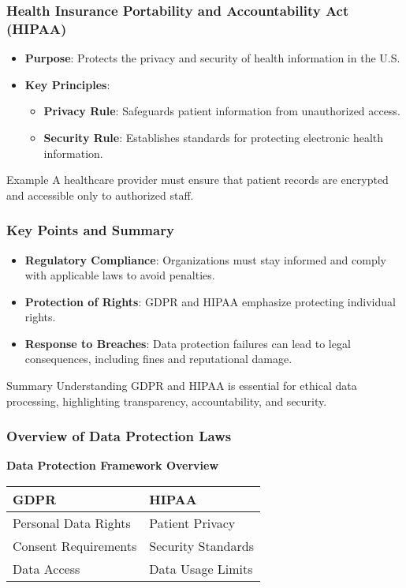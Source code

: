 \documentclass{beamer}
\begin{document}
\begin{frame}[fragile]
    \frametitle{Health Insurance Portability and Accountability Act (HIPAA)}
    \begin{itemize}
        \item \textbf{Purpose}: Protects the privacy and security of health information in the U.S.
        \item \textbf{Key Principles}:
        \begin{itemize}
            \item \textbf{Privacy Rule}: Safeguards patient information from unauthorized access.
            \item \textbf{Security Rule}: Establishes standards for protecting electronic health information.
        \end{itemize}
    \end{itemize}
    \begin{block}{Example}
        A healthcare provider must ensure that patient records are encrypted and accessible only to authorized staff.
    \end{block}
\end{frame}

\begin{frame}[fragile]
    \frametitle{Key Points and Summary}
    \begin{itemize}
        \item \textbf{Regulatory Compliance}: Organizations must stay informed and comply with applicable laws to avoid penalties.
        \item \textbf{Protection of Rights}: GDPR and HIPAA emphasize protecting individual rights.
        \item \textbf{Response to Breaches}: Data protection failures can lead to legal consequences, including fines and reputational damage.
    \end{itemize}
    \begin{block}{Summary}
        Understanding GDPR and HIPAA is essential for ethical data processing, highlighting transparency, accountability, and security.
    \end{block}
\end{frame}

\begin{frame}[fragile]
    \frametitle{Overview of Data Protection Laws}
    \centering
    \textbf{Data Protection Framework Overview}
    \begin{table}[h]
        \begin{tabular}{|l|l|}
            \hline
            \textbf{GDPR} & \textbf{HIPAA} \\ \hline
            Personal Data Rights & Patient Privacy \\ \hline
            Consent Requirements & Security Standards \\ \hline
            Data Access & Data Usage Limits \\ \hline
        \end{tabular}
    \end{table}
\end{frame}
\end{document}
